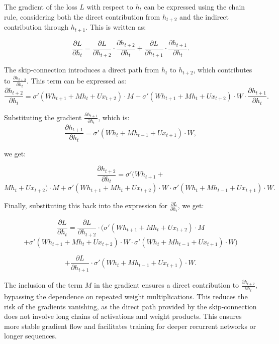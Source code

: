 \begin{qsolve}
  \begin{qsolve}[]
  
The gradient of the loss \( L \) with respect to \( h_t \) can be expressed using the chain rule, considering both the direct contribution from \( h_{t+2} \) and the indirect contribution through \( h_{t+1} \). This is written as:

\[
\frac{\partial L}{\partial h_t} = \frac{\partial L}{\partial h_{t+2}} \cdot \frac{\partial h_{t+2}}{\partial h_t} + \frac{\partial L}{\partial h_{t+1}} \cdot \frac{\partial h_{t+1}}{\partial h_t}.
\]

The skip-connection introduces a direct path from \( h_t \) to \( h_{t+2} \), which contributes to \( \frac{\partial h_{t+2}}{\partial h_t} \). This term can be expressed as:
\[
\frac{\partial h_{t+2}}{\partial h_t} = \sigma'(W h_{t+1} + M h_t + U x_{t+2}) \cdot M + \sigma'(W h_{t+1} + M h_t + U x_{t+2}) \cdot W \cdot \frac{\partial h_{t+1}}{\partial h_t}.
\]

Substituting the gradient \( \frac{\partial h_{t+1}}{\partial h_t} \), which is:
\splitqsolve[\splitqsolve]
\[
\frac{\partial h_{t+1}}{\partial h_t} = \sigma'(W h_t + M h_{t-1} + U x_{t+1}) \cdot W,
\]

we get:

\[
\frac{\partial h_{t+2}}{\partial h_t} = \sigma'(W h_{t+1} +
\]
\[ 
M h_t + U x_{t+2}) \cdot M + \sigma'(W h_{t+1} + M h_t + U x_{t+2}) \cdot W \cdot \sigma'(W h_t + M h_{t-1} + U x_{t+1}) \cdot W.
\]

Finally, substituting this back into the expression for \( \frac{\partial L}{\partial h_t} \), we get:

\[
\frac{\partial L}{\partial h_t} = \frac{\partial L}{\partial h_{t+2}} \cdot ( \sigma'(W h_{t+1} +
M h_t + U x_{t+2}) \cdot M 
\]
\[
+ \sigma'(W h_{t+1} + M h_t + U x_{t+2}) \cdot W \cdot \sigma'(W h_t + M h_{t-1} + U x_{t+1}) \cdot W )
\]

\[
+ \frac{\partial L}{\partial h_{t+1}} \cdot \sigma'(W h_t + M h_{t-1} + U x_{t+1}) \cdot W.
\]

The inclusion of the term \( M \) in the gradient ensures a direct contribution to \( \frac{\partial h_{t+2}}{\partial h_t} \), bypassing the dependence on repeated weight multiplications. This reduces the risk of the gradients vanishing, as the direct path provided by the skip-connection does not involve long chains of activations and weight products. This ensures more stable gradient flow and facilitates training for deeper recurrent networks or longer sequences.

  \end{qsolve}
\end{qsolve}

